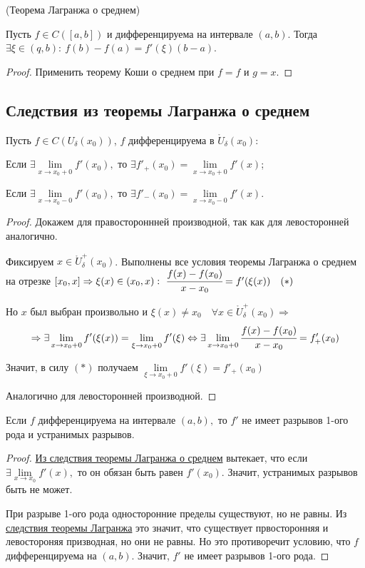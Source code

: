 \begin{corollary}
	\hypertarget{thrm5.11cor}{(Теорема Лагранжа о среднем)} Пусть $f \in C([a, b])$ и дифференцируема на интервале $(a, b)$. Тогда $\exists \xi \in (q, b): \ f(b) - f(a) = f'(\xi)(b-a)$.
\end{corollary}
\begin{proof}
	Применить теорему Коши о среднем при $f = f$ и $g = x$.
\end{proof}

\subsection{Следствия из теоремы Лагранжа о среднем}

\begin{theorem}
	\hypertarget{thm5.12}{Пусть $f \in C(U_{\delta}(x_{0}))$, $f$ дифференцируема в $\mathring{U}_{\delta}(x_{0})$:}
	
	Если $\exists \lim\limits_{x \to x_{0}+0} f'(x_{0}),$ то $\exists f'_{+}(x_{0}) = \lim\limits_{x\to x_{0}+0} f'(x)$;
	
	Если $\exists \lim\limits_{x \to x_{0}-0} f'(x_{0}),$ то $\exists f'_{-}(x_{0}) = \lim\limits_{x\to x_{0}-0} f'(x)$.
\end{theorem}
\begin{proof}
	Докажем для правостороннней производной, так как для левосторонней аналогично.
	
	Фиксируем $x\in \mathring{U}^{+}_{\delta}(x_{0})$. Выполнены все условия теоремы Лагранжа о среднем на отрезке $[x_{0}, x] \Rightarrow \xi(x) \in (x_{0}, x):\  \cfrac{f(x) - f(x_{0})}{x-x_{0}} = f'(\xi(x)) \quad (*)$
	
	Но $x$ был выбран произвольно и $\xi(x) \neq x_{0} \quad \forall x \in \mathring{U}^{+}_{\delta}(x_{0}) \Rightarrow $
	$$\Rightarrow \exists \lim\limits_{x \to x_{0}+0} f'(\xi(x)) =\lim\limits_{\xi \to x_{0}+0} f'(\xi) \Leftrightarrow \exists \lim\limits_{x \to x_{0}+0} \cfrac{f(x) - f(x_{0})}{x-x_{0}} = f'_{+}(x_{0})$$
	
	Значит, в силу $(*)$ получаем
	$
	\lim\limits_{\xi \to x_{0}+0} f'(\xi) = f'_{+}(x_{0})
	$
	
	Аналогично для левосторонней производной.
\end{proof}

\begin{corollary}
	Если $f$ дифференцируема на интервале $(a, b),$ то $f'$ не имеет разрывов 1-ого рода и устранимых разрывов.
\end{corollary}
\begin{proof}
	\hyperlink{thm5.12}{Из следствия теоремы Лагранжа о среднем} вытекает, что если $\exists \lim\limits_{x\to x_{0}} f'(x),$ то он обязан быть равен $f'(x_{0})$. Значит, устранимых разрывов быть не может.
	
	При разрыве 1-ого рода односторонние пределы существуют, но не равны. Из \hyperlink{thm5.12}{следствия теоремы Лагранжа} это значит, что существует првосторонняя и левостороняя призводная, но они не равны. Но это противоречит условию, что $f$ дифференцируема на $(a, b)$. Значит, $f'$ не имеет разрывов 1-ого рода. 
	
\end{proof}

